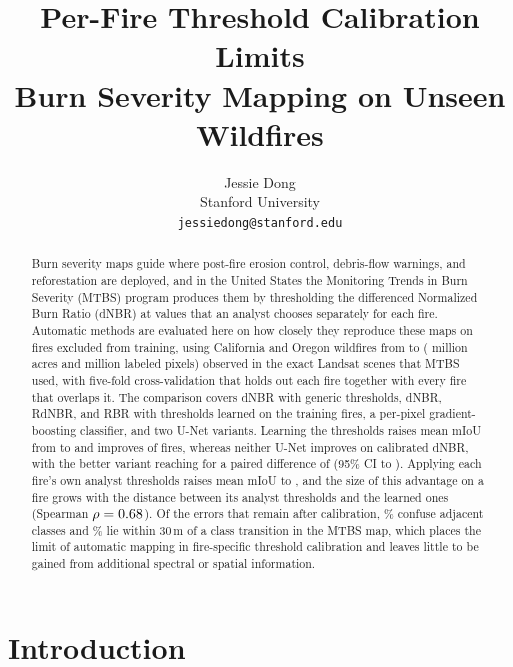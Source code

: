 \documentclass[10pt]{article}
\title{Per-Fire Threshold Calibration Limits\\Burn Severity Mapping on Unseen Wildfires}
\author{Jessie Dong\\[2pt]
Stanford University\\[2pt]
\texttt{jessiedong@stanford.edu}}
\date{}
\begin{document}
\maketitle

\begin{abstract}
Burn severity maps guide where post-fire erosion control, debris-flow warnings, and reforestation are deployed, and in the United States the Monitoring Trends in Burn Severity (MTBS) program produces them by thresholding the differenced Normalized Burn Ratio (dNBR) at values that an analyst chooses separately for each fire.
Automatic methods are evaluated here on how closely they reproduce these maps on fires excluded from training, using \mFires{} California and Oregon wildfires from \mYearMin{} to \mYearMax{} (\mAcresM{} million acres and \mPixelsM{} million labeled pixels) observed in the exact Landsat scenes that MTBS used, with five-fold cross-validation that holds out each fire together with every fire that overlaps it.
The comparison covers dNBR with generic thresholds, dNBR, RdNBR, and RBR with thresholds learned on the training fires, a per-pixel gradient-boosting classifier, and two U-Net variants.
Learning the thresholds raises mean mIoU from \mdnbrgenericMiou{} to \mdnbrlearnedMiou{} and improves \mWinsLearnGen{} of \mFires{} fires, whereas neither U-Net improves on calibrated dNBR, with the better variant reaching \mBestUnetMiou{} for a paired difference of \mDiffLearned{} (95\% CI \mDiffLearnedLo{} to \mDiffLearnedHi).
Applying each fire's own analyst thresholds raises mean mIoU to \moracleMiou, and the size of this advantage on a fire grows with the distance between its analyst thresholds and the learned ones (Spearman $\rho=0.68$).
Of the errors that remain after calibration, \aDnbrLearnedAdjShare\% confuse adjacent classes and \aDnbrLearnedErrNearShare\% lie within 30\,m of a class transition in the MTBS map, which places the limit of automatic mapping in fire-specific threshold calibration and leaves little to be gained from additional spectral or spatial information.
\end{abstract}

\section{Introduction}
\label{sec:intro}
\end{document}
